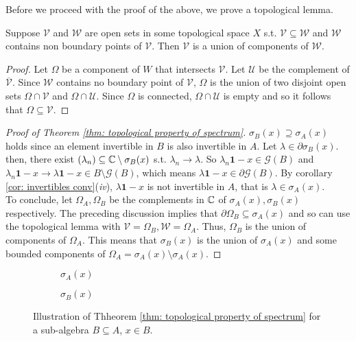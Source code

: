 \documentclass{article}
\begin{document}
Before we proceed with the proof of the above, we prove a topological lemma.

\begin{boxlemma}\label{lemma: topological lemma}
    Suppose $\mathcal{V}$ and $\mathcal{W}$ are open sets in some topological space $X$ s.t. $\mathcal{V} \subseteq \mathcal{W}$ and $\mathcal{W}$ contains non boundary points of $\mathcal{V}$. Then $\mathcal{V}$ is a union of components of $\mathcal{W}$.
\end{boxlemma}

\begin{proof}
    Let $\Omega$ be a component of $W$ that intersects $\mathcal{V}$. Let $\mathcal{U}$ be the complement of $\overline{\mathcal{V}}$. Since $\mathcal{W}$ contains no boundary point of $\mathcal{V}$, $\Omega$ is the union of two disjoint open sets $\Omega\cap \mathcal{V}$ and $\Omega \cap \mathcal{U}$. Since $\Omega$ is connected, $\Omega\cap \mathcal{U}$ is empty and so it follows that $\Omega \subseteq\mathcal{V}$.
\end{proof}

\begin{proof}[Proof of Theorem \ref{thm: topological property of spectrum}]
    $\sigma_B(x)\supseteq \sigma_A(x)$ holds since an element invertible in $B$ is also invertible in $A$. Let $\lambda\in \partial\sigma_B(x)$. then, there exist $(\lambda_n)\subseteq \mathbb{C}\setminus \sigma_B(x)$ s.t. $\lambda_n\to \lambda$. So $\lambda_n\mathbf{1}-x\in\mathcal{G}(B)$ and $\lambda_n\mathbf{1}-x\to \lambda\mathbf{1}-x\in B \setminus\mathcal{G}(B)$, which means $\lambda\mathbf{1}-x\in \partial \mathcal{G}(B)$. By corollary \ref{cor: invertibles conv}(\textit{iv}), $\lambda\mathbf{1}-x$ is not invertible in $A$, that is $\lambda\in \sigma_A(x)$.\\
    
    To conclude, let $\Omega_A, \Omega_B$ be the complements in $\mathbb{C}$ of $\sigma_A(x), \sigma_B(x)$ respectively. The preceding discussion implies that $\partial\Omega_B\subseteq\sigma_A(x)$ and so can use the topological lemma with $\mathcal{V} = \Omega_B, \mathcal{W} = \Omega_A$. Thus, $\Omega_B$ is the union of components of $\Omega_A$. This means that $\sigma_B(x)$ is the union of $\sigma_A(x)$ and some bounded components of $\Omega_A=\sigma_A(x)\setminus \sigma_A(x)$.
\end{proof}

\begin{figure}[H]
\begin{subfigure}{0.5\textwidth}
  \centering
  
  \caption{$\sigma_A(x)$}
  \label{fig: spectrum A}
\end{subfigure}%
\begin{subfigure}{0.5\textwidth}
  \centering
  
  \caption{$\sigma_B(x)$}
  \label{fig: spectrum B}
\end{subfigure}
\caption{Illustration of Thheorem \ref{thm: topological property of spectrum} for a sub-algebra $B\subseteq A$, $x\in B$.}
\label{fig:fig}
\end{figure}
\end{document}
